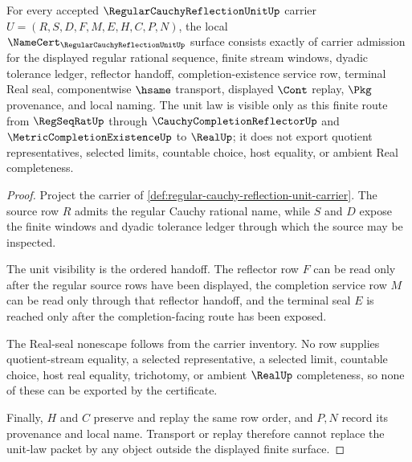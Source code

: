 \begin{theorem}
\label{thm:regular-cauchy-reflection-unit-namecert-obligations}
For every accepted $\RegularCauchyReflectionUnitUp$ carrier $U=(R,S,D,F,M,E,H,C,P,N)$, the local $\NameCert_{\RegularCauchyReflectionUnitUp}$ surface consists exactly of carrier admission for the displayed regular rational sequence, finite stream windows, dyadic tolerance ledger, reflector handoff, completion-existence service row, terminal Real seal, componentwise $\hsame$ transport, displayed $\Cont$ replay, $\Pkg$ provenance, and local naming. The unit law is visible only as this finite route from $\RegSeqRatUp$ through $\CauchyCompletionReflectorUp$ and $\MetricCompletionExistenceUp$ to $\RealUp$; it does not export quotient representatives, selected limits, countable choice, host equality, or ambient Real completeness.
\end{theorem}
\begin{proof}
Project the carrier of \autoref{def:regular-cauchy-reflection-unit-carrier}. The source row $R$ admits the regular Cauchy rational name, while $S$ and $D$ expose the finite windows and dyadic tolerance ledger through which the source may be inspected.

The unit visibility is the ordered handoff. The reflector row $F$ can be read only after the regular source rows have been displayed, the completion service row $M$ can be read only through that reflector handoff, and the terminal seal $E$ is reached only after the completion-facing route has been exposed.

The Real-seal nonescape follows from the carrier inventory. No row supplies quotient-stream equality, a selected representative, a selected limit, countable choice, host real equality, trichotomy, or ambient $\RealUp$ completeness, so none of these can be exported by the certificate.

Finally, $H$ and $C$ preserve and replay the same row order, and $P,N$ record its provenance and local name. Transport or replay therefore cannot replace the unit-law packet by any object outside the displayed finite surface.
\end{proof}


